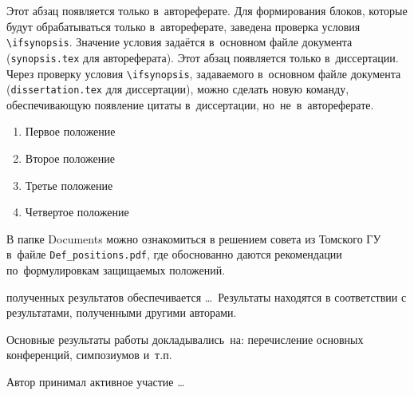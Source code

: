 \ifsynopsis
Этот абзац появляется только в~автореферате.
Для формирования блоков, которые будут обрабатываться только в~автореферате,
заведена проверка условия \verb!\!\verb!ifsynopsis!.
Значение условия задаётся в~основном файле документа (\verb!synopsis.tex! для
автореферата).
\else
Этот абзац появляется только в~диссертации.
Через проверку условия \verb!\!\verb!ifsynopsis!, задаваемого в~основном файле
документа (\verb!dissertation.tex! для диссертации), можно сделать новую
команду, обеспечивающую появление цитаты в~диссертации, но~не~в~автореферате.
\fi





{}
\begin{enumerate}[beginpenalty=10000] %
  \item Первое положение
  \item Второе положение
  \item Третье положение
  \item Четвертое положение
\end{enumerate}
В папке Documents можно ознакомиться в решением совета из Томского ГУ
в~файле \verb+Def_positions.pdf+, где обоснованно даются рекомендации
по~формулировкам защищаемых положений.

{\reliability} полученных результатов обеспечивается \ldots \ Результаты находятся в соответствии с результатами, полученными другими авторами.


{\probation}
Основные результаты работы докладывались~на:
перечисление основных конференций, симпозиумов и~т.\:п.

{\contribution} Автор принимал активное участие \ldots

